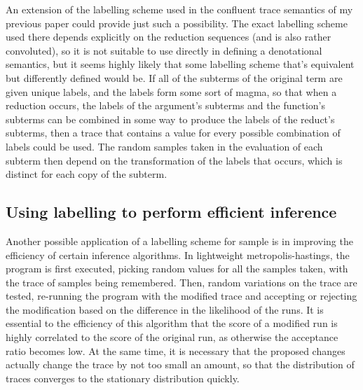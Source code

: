 \documentclass[titlepage]{article}
\begin{document}

 

An extension of the labelling scheme used in the confluent trace semantics of my previous paper could provide just such a possibility. The exact labelling scheme used there depends explicitly on the reduction sequences (and is also rather convoluted), so it is not suitable to use directly in defining a denotational semantics, but it seems highly likely that some labelling scheme that's equivalent but differently defined would be. If all of the subterms of the original term are given unique labels, and the labels form some sort of magma, so that when a reduction occurs, the labels of the argument's subterms and the function's subterms can be combined in some way to produce the labels of the reduct's subterms, then a trace that contains a value for every possible combination of labels could be used. The random samples taken in the evaluation of each subterm then depend on the transformation of the labels that occurs, which is distinct for each copy of the subterm.


\subsection{Using labelling to perform efficient inference}
Another possible application of a labelling scheme for sample is in improving the efficiency of certain inference algorithms. In lightweight metropolis-hastings, the program is first executed, picking random values for all the samples taken, with the trace of samples being remembered. Then, random variations on the trace are tested, re-running the program with the modified trace and accepting or rejecting the modification based on the difference in the likelihood of the runs. It is essential to the efficiency of this algorithm that the score of a modified run is highly correlated to the score of the original run, as otherwise the acceptance ratio becomes low. At the same time, it is necessary that the proposed changes actually change the trace by not too small an amount, so that the distribution of traces converges to the stationary distribution quickly.
\end{document}
